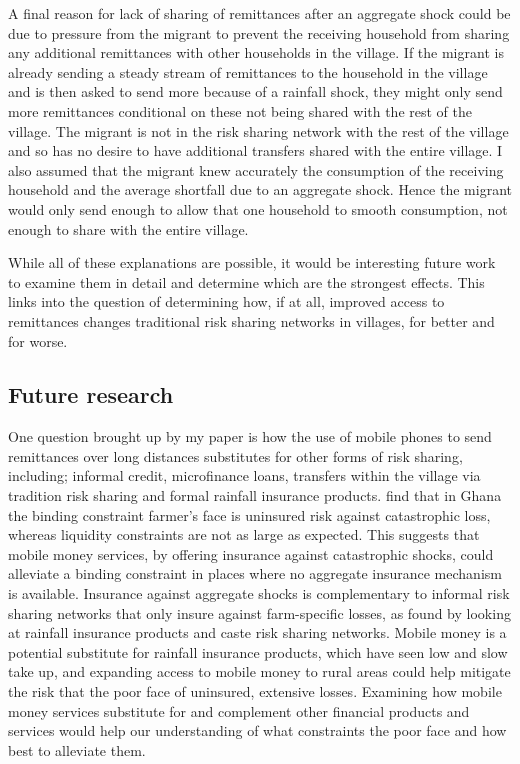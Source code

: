 A final reason for lack of sharing of remittances after an aggregate shock could be due to pressure from the migrant to prevent the receiving household from sharing any additional remittances with other households in the village. If the migrant is already sending a steady stream of remittances to the household in the village and is then asked to send more because of a rainfall shock, they might only send more remittances conditional on these not being shared with the rest of the village. The migrant is not in the risk sharing network with the rest of the village and so has no desire to have additional transfers shared with the entire village. I also assumed that the migrant knew accurately the consumption of the receiving household and the average shortfall due to an aggregate shock. Hence the migrant would only send enough to allow that one household to smooth consumption, not enough to share with the entire village.  

While all of these explanations are possible, it would be interesting future work to examine them in detail and determine which are the strongest effects. This links into the question of determining how, if at all, improved access to remittances changes traditional risk sharing networks in villages, for better and for worse. 


\subsection{Future research}

One question brought up by my paper is how the use of mobile phones to send remittances over long distances substitutes for other forms of risk sharing, including; informal credit, microfinance loans, transfers within the village via tradition risk sharing and formal rainfall insurance products. \cite{karlanudry2012} find that in Ghana the binding constraint farmer's face is uninsured risk against catastrophic loss, whereas liquidity constraints are not as large as expected. This suggests that mobile money services, by offering insurance against catastrophic shocks, could alleviate a binding constraint in places where no aggregate insurance mechanism is available. Insurance against aggregate shocks is complementary to informal risk sharing networks that only insure against farm-specific losses, as found by \cite{mobarakrosenzweig2012} looking at rainfall insurance products and caste risk sharing networks. Mobile money is a potential substitute for rainfall insurance products, which have seen low and slow take up, and expanding access to mobile money to rural areas could help mitigate the risk that the poor face of uninsured, extensive losses. Examining how mobile money services substitute for and complement other financial products and services would help our understanding of what constraints the poor face and how best to alleviate them. 

